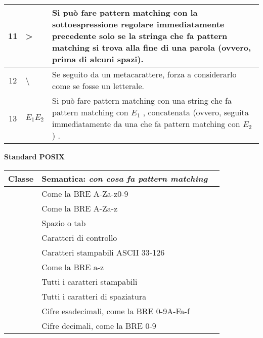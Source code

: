 \begin{center}
\begin{tabular}{|c|p{3cm}|p{10cm}|}
		11	& >			& Si può fare pattern matching con la sottoespressione regolare immediatamente precedente solo se la stringa che fa pattern matching si trova alla fine di una parola (ovvero, prima di alcuni spazi). \\ \hline
		12	& \textbackslash	& Se seguito da un metacarattere, forza a considerarlo come se fosse un letterale. \\ \hline
		13	& $E_{1}E_{2}$		& Si può fare pattern matching con una string che fa 
		pattern matching con $ E_{1} $ , concatenata (ovvero, seguita immediatamente da una che fa pattern matching con $ E_{2} $) .\\
		 
		 \hline
	\end{tabular}
\end{center}
\newpage
\begin{center}
	\textbf{Standard POSIX} \\
	\begin{tabular}{|c|l|l|}
	\hline
		\textbf{Classe} & \textbf{Semantica: \textit{con cosa fa pattern matching}} \\ \hline
		[:alnum:]	& Come la BRE A-Za-z0-9 \\ \hline
		[:alpha:]	& Come la BRE A-Za-z \\ \hline
		[:blank:]	& Spazio o tab \\ \hline
		[:cntrl:]	& Caratteri di controllo \\ \hline
		[:graph:]	& Caratteri stampabili ASCII 33-126 \\ \hline
		[:lower:]	& Come la BRE a-z \\ \hline
		[:print:]	& Tutti i caratteri stampabili \\ \hline
		[:space:]	& Tutti i caratteri di spaziatura \\ \hline
		[:xdigit:]	& Cifre esadecimali, come la BRE 0-9A-Fa-f \\ \hline
		[:digit:]	& Cifre decimali, come la BRE 0-9 \\ \hline
	\end{tabular}
\end{center}

